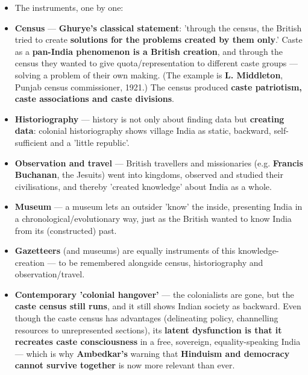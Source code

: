 \begin{KeyConcept}
\begin{itemize}
\item The instruments, one by one:
\item \textbf{Census} --- \textbf{Ghurye's classical statement}: 'through the census, the British tried to create \textbf{solutions for the problems created by them only}.' Caste as a \textbf{pan-India phenomenon is a British creation}, and through the census they wanted to give quota/representation to different caste groups --- solving a problem of their own making. (The example is \textbf{L. Middleton}, Punjab census commissioner, 1921.) The census produced \textbf{caste patriotism, caste associations and caste divisions}.
\item \textbf{Historiography} --- history is not only about finding data but \textbf{creating data}: colonial historiography shows village India as static, backward, self-sufficient and a 'little republic'.
\item \textbf{Observation and travel} --- British travellers and missionaries (e.g. \textbf{Francis Buchanan}, the Jesuits) went into kingdoms, observed and studied their civilisations, and thereby 'created knowledge' about India as a whole.
\item \textbf{Museum} --- a museum lets an outsider 'know' the inside, presenting India in a chronological/evolutionary way, just as the British wanted to know India from its (constructed) past.
\item \textbf{Gazetteers} (and museums) are equally instruments of this knowledge-creation --- to be remembered alongside census, historiography and observation/travel.
\item \textbf{Contemporary 'colonial hangover'} --- the colonialists are gone, but the \textbf{caste census still runs}, and it still shows Indian society as backward. Even though the caste census has advantages (delineating policy, channelling resources to unrepresented sections), its \textbf{latent dysfunction is that it recreates caste consciousness} in a free, sovereign, equality-speaking India --- which is why \textbf{Ambedkar's} warning that \textbf{Hinduism and democracy cannot survive together} is now more relevant than ever.
\end{itemize}
\end{KeyConcept}

